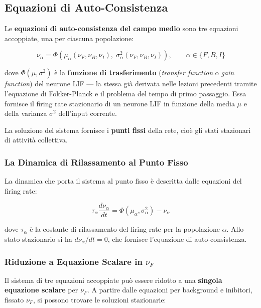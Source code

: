\subsection{Equazioni di Auto-Consistenza}


Le \textbf{equazioni di auto-consistenza del campo medio} sono tre equazioni accoppiate, una per ciascuna popolazione:

\begin{equation}
\nu_\alpha = \Phi\!\left(\mu_\alpha(\nu_F, \nu_B, \nu_I),\; \sigma^2_\alpha(\nu_F, \nu_B, \nu_I)\right), \qquad \alpha \in \{F, B, I\}
\end{equation}

dove $\Phi(\mu, \sigma^2)$ è la \textbf{funzione di trasferimento} (\textit{transfer function} o \textit{gain function}) del neurone LIF — la stessa già derivata nelle lezioni precedenti tramite l'equazione di Fokker-Planck e il problema del tempo di primo passaggio. Essa fornisce il firing rate stazionario di un neurone LIF in funzione della media $\mu$ e della varianza $\sigma^2$ dell'input corrente.

La soluzione del sistema fornisce i \textbf{punti fissi} della rete, cioè gli stati stazionari di attività collettiva.

\subsubsection{La Dinamica di Rilassamento al Punto Fisso}

La dinamica che porta il sistema al punto fisso è descritta dalle equazioni del firing rate:

\begin{equation}
\tau_\alpha \frac{d\nu_\alpha}{dt} = \Phi(\mu_\alpha, \sigma^2_\alpha) - \nu_\alpha
\end{equation}

dove $\tau_\alpha$ è la costante di rilassamento del firing rate per la popolazione $\alpha$. Allo stato stazionario si ha $d\nu_\alpha/dt = 0$, che fornisce l'equazione di auto-consistenza.

\subsubsection{Riduzione a Equazione Scalare in $\nu_F$}

Il sistema di tre equazioni accoppiate può essere ridotto a una \textbf{singola equazione scalare} per $\nu_F$. A partire dalle equazioni per background e inibitori, fissato $\nu_F$, si possono trovare le soluzioni stazionarie:

